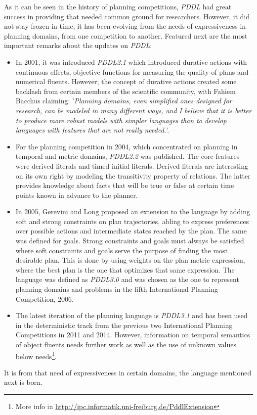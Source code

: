 As it can be seen in the history of planning competitions, \textit{PDDL} had
great success in providing that needed common ground for researchers.
However, it did not stay frozen in time, it has been evolving from the needs of
expressiveness in planning domains, from one competition to another. Featured
next are the most important remarks about the updates on \textit{PDDL}:
\begin{itemize}
    \item In 2001, it was introduced \textit{PDDL2.1} \cite{Fox2003} which
    introduced durative actions with continuous effects, objective functions for
    measuring the quality of plans and numerical fluents. However, the concept
    of durative actions created some backlash from certain members of the
    scientific community, with Fahiem Bacchus \cite{Bacchus2003} claiming:
    '\textit{Planning domains, even simplified ones designed for research, can
    be modeled in many different ways, and I believe that it is better to
    produce more robust models with simpler languages than to develop languages
    with features that are not really needed.}'.
    \item For the planning competition in 2004, which concentrated on planning
    in temporal and metric domains, \textit{PDDL2.2} \cite{Edelkamp2004} was
    published. The core features were derived literals and timed initial
    literals. Derived literals are interesting on its own right by modeling
    the transitivity property of relations. The latter provides knowledge about
    facts that will be true or false at certain time points known in advance to
    the planner.
    \item In 2005, Gerevini and Long \cite{Gerevini2005} proposed an extension
    to the language by adding soft and strong constraints on plan trajectories,
    abling to express preferences over possible actions and intermediate states
    reached by the plan. The same was defined for goals. Strong constraints and
    goals must always be satisfied where soft constraints and goals serve the
    purpose of finding the most desirable plan. This is done by using weights
    on the plan metric expression, where the best plan is the one that optimizes
    that same expression. The language was defined as \textit{PDDL3.0} and was
    chosen as the one to represent planning domains and problems in the fifth
    International Planning Competition, 2006.
    \item The latest iteration of the planning language is \textit{PDDL3.1}
    \cite{Kovacs2011} and has been used in the deterministic track from the
    previous two International Planning Competitions in 2011 and 2014.
    However, information on temporal semantics of object fluents needs further
    work as well as the use of unknown values below needs\footnote{More info in
    \url{http://ipc.informatik.uni-freiburg.de/PddlExtension}}.


\end{itemize}
It is from that need of expressiveness in certain domains, the language
mentioned next is born.

